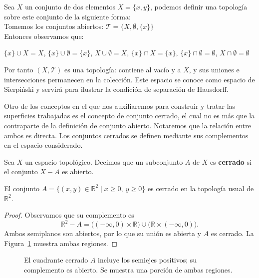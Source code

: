 \begin{example}
    Sea $X$ un conjunto de dos elementos $X = \{x,y\}$, podemos definir una topología sobre este conjunto de la siguiente forma:
    \\Tomemos los conjuntos abiertos: $\mathcal{T} = \{X,\emptyset, \{x\} \}$
    \\Entonces observamos que:
    
    $\{x\} \cup X =X$, $\{x\} \cup \emptyset = \{x\}$,
    $X \cup \emptyset = X$, $\{x\} \cap X = \{x\}$,
    $\{x\} \cap \emptyset = \emptyset$, $X \cap \emptyset = \emptyset$
    
    Por tanto $(X,\mathcal{T})$ es una topología: contiene al vacío y a $X$, y sus uniones e intersecciones permanecen en la colección. Este espacio se conoce como espacio de Sierpiński y servirá para ilustrar la condición de separación de Hausdorff.
    
\end{example}
Otro de los conceptos en el que nos auxiliaremos para construir y tratar las superficies trabajadas es el concepto de conjunto cerrado, el cual no es más que la contraparte de la definición de conjunto abierto. Notaremos que la relación entre ambos es directa.
Los conjuntos cerrados se definen mediante sus complementos en el espacio considerado.

\begin{definition}
\label{def:conjunto-cerrado}
    Sea $X$ un espacio topológico. Decimos que un subconjunto $A$ de $X$ es \textbf{cerrado} si el conjunto $X-A$ es abierto.   
\end{definition}

\begin{example}
El conjunto $A=\{(x,y)\in\mathbb{R}^2\mid x\geq0,\ y\geq0\}$ es cerrado en la topología usual de $\mathbb{R}^2$.
\begin{proof}
Observamos que su complemento es
\[
\mathbb{R}^2-A=\bigl((-\infty,0)\times\mathbb{R}\bigr)
\cup\bigl(\mathbb{R}\times(-\infty,0)\bigr).
\]
Ambos semiplanos son abiertos, por lo que su unión es abierta y $A$ es cerrado. La Figura~\ref{fig:cerrado} muestra ambas regiones.
\end{proof}
\end{example}

\begin{figure}[H]
    \centering
    \caption{El cuadrante cerrado $A$ incluye los semiejes positivos; su complemento es abierto. Se muestra una porción de ambas regiones.}
    \label{fig:cerrado}
\end{figure}

